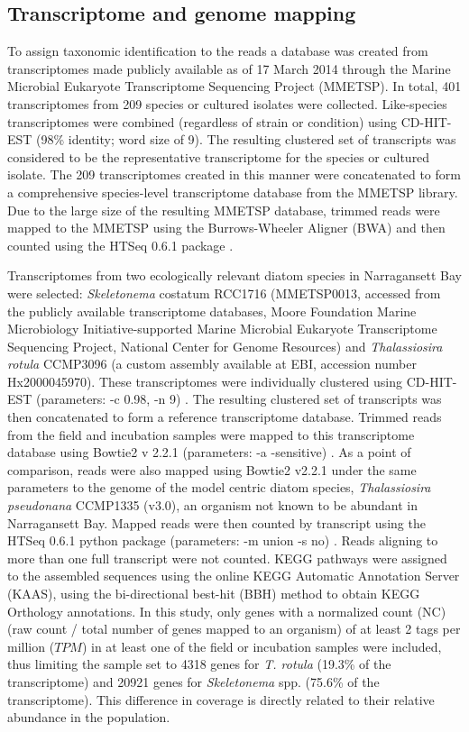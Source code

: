 \subsection{Transcriptome and genome mapping}
To assign taxonomic identification to the reads a database was created from transcriptomes made publicly available as of 17 March 2014 through the Marine Microbial Eukaryote Transcriptome Sequencing Project (MMETSP). In total, 401 transcriptomes from 209 species or cultured isolates were collected. Like-species transcriptomes were combined (regardless of strain or condition) using CD-HIT-EST (98\% identity; word size of 9). The resulting clustered set of transcripts was considered to be the representative transcriptome for the species or cultured isolate. The 209 transcriptomes created in this manner were concatenated to form a comprehensive species-level transcriptome database from the MMETSP library. Due to the large size of the resulting MMETSP database, trimmed reads were mapped to the MMETSP using the Burrows-Wheeler Aligner (BWA) \citep{Li2010} and then counted using the HTSeq 0.6.1 package \citep{Anders2014}.\par 
Transcriptomes from two ecologically relevant diatom species in Narragansett Bay were selected: \textit{Skeletonema} costatum RCC1716 (MMETSP0013, accessed from the publicly available transcriptome databases, Moore Foundation Marine Microbiology Initiative-supported Marine Microbial Eukaryote Transcriptome Sequencing Project, National Center for Genome Resources) and \textit{Thalassiosira rotula} CCMP3096 (a custom assembly available at EBI, accession number Hx2000045970). These transcriptomes were individually clustered using CD-HIT-EST (parameters: -c 0.98, -n 9) \citep{Li2006}. The resulting clustered set of transcripts was then concatenated to form a reference transcriptome database. Trimmed reads from the field and incubation samples were mapped to this transcriptome database using Bowtie2 v 2.2.1 (parameters: -a -sensitive) \citep{Langmead2012}. As a point of comparison, reads were also mapped using Bowtie2 v2.2.1 under the same parameters to the genome of the model centric diatom species, \textit{Thalassiosira pseudonana} CCMP1335 (v3.0), an organism not known to be abundant in Narragansett Bay. Mapped reads were then counted by transcript using the HTSeq 0.6.1 python package (parameters: -m union -s no) \citep{Anders2014}. Reads aligning to more than one full transcript were not counted. KEGG pathways were assigned to the assembled sequences using the online KEGG Automatic Annotation Server (KAAS), using the bi-directional best-hit (BBH) method to obtain KEGG Orthology annotations. In this study, only genes with a normalized count (NC) (raw count / total number of genes mapped to an organism) of at least 2 tags per million ($TPM$) in at least one of the field or incubation samples were included, thus limiting the sample set to 4318 genes for \textit{T. rotula} (19.3\% of the transcriptome) and 20921 genes for \textit{Skeletonema} spp. (75.6\% of the transcriptome). This difference in coverage is directly related to their relative abundance in the population.
